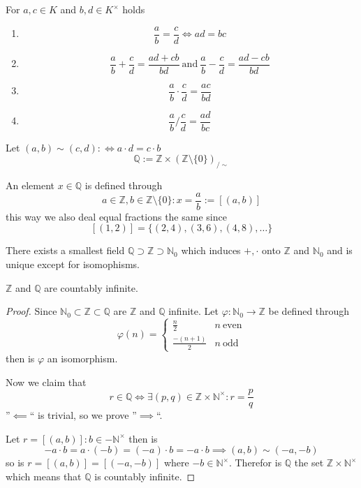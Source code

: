 \begin{lemma}
   For \(a, c \in K\) and \(b, d \in K^\times\) holds
   \begin{enumerate}[label=\roman*, align=Center]
      \item \[\frac{a}{b} = \frac{c}{d} \iff ad = bc\]
      \item \[\frac{a}{b} + \frac{c}{d} = \frac{ad + cb}{bd}~\text{and}~\frac{a}{b} - \frac{c}{d} = \frac{ad - cb}{bd}\]
      \item \[\frac{a}{b} \cdot \frac{c}{d} = \frac{ac}{bd}\]
      \item \[\frac{a}{b} / \frac{c}{d} = \frac{ad}{bc}\]
   \end{enumerate}
\end{lemma}

 \begin{definition}\label{def:rat_num}
    Let \((a, b) \sim (c, d) :\iff a \cdot d = c \cdot b\)
    \[\mathbb{Q} := \mathbb{Z} \times (\mathbb{Z} \setminus \{0\})_{/\sim}\]
 \end{definition}
 \begin{remark}[Notation]
    An element \(x \in \mathbb{Q}\) is defined through
    \[a \in \mathbb{Z}, b \in \mathbb{Z} \setminus \{0\}: x = \frac{a}{b} := [(a, b)]\]
    this way we also deal equal fractions the same since
    \[[(1, 2)] = \{(2, 4), (3, 6), (4, 8), \ldots\}\]
 \end{remark}

\begin{theorem}
   There exists a smallest field \(\mathbb{Q} \supset \mathbb{Z} \supset \mathbb{N}_0\) which induces \(+, \cdot\) onto \(\mathbb{Z}\) and \(\mathbb{N}_0\) and is unique except for isomophisms.
\end{theorem}

\begin{proposition}
   \(\mathbb{Z}\) and \(\mathbb{Q}\) are countably infinite.
\end{proposition}
\begin{proof}
   Since \(\mathbb{N}_0 \subset \mathbb{Z} \subset \mathbb{Q}\) are \(\mathbb{Z}\) and \(\mathbb{Q}\) infinite.
   Let \(\varphi: \mathbb{N}_0 \to \mathbb{Z}\) be defined through
   \[\varphi(n) = \begin{cases}\frac{n}{2} & n~\text{even}\\ \frac{-(n+1)}{2} & n~\text{odd}\end{cases}\]
   then is \(\varphi\) an isomorphism.

   Now we claim that
   \[r \in \mathbb{Q} \iff \exists (p, q) \in \mathbb{Z} \times \mathbb{N}^\times: r = \frac{p}{q}\]
   ''\(\impliedby\)`` is trivial, so we prove ''\(\implies\)``.

   Let \(r = [(a,b)]: b \in -\mathbb{N}^\times\) then is
   \[-a \cdot b = a \cdot (-b) = (-a) \cdot b = -a \cdot b \implies (a,b) \sim (-a, -b)\]
   so is \(r = [(a,b)] = [(-a, -b)]\) where \(-b \in \mathbb{N}^\times\).
   Therefor is \(\mathbb{Q}\) the set \(\mathbb{Z} \times \mathbb{N}^\times\) which means that \(\mathbb{Q}\) is countably infinite.
\end{proof}

